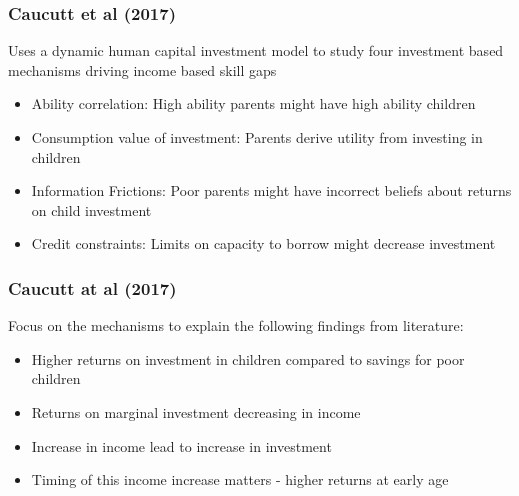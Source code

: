 \documentclass{beamer}
\begin{document}
\begin{frame}
\frametitle{Caucutt et al (2017)}
Uses a dynamic human capital investment model to study four investment based mechanisms driving income based skill gaps
\begin{itemize}
\item Ability correlation: High ability parents might have high ability children 

\item Consumption value of investment: Parents derive utility from investing in children

\item Information Frictions: Poor parents might have incorrect beliefs about returns on child investment
\item Credit constraints: Limits on capacity to borrow might decrease investment

\end{itemize}
\end{frame}


\begin{frame}
\frametitle{Caucutt at al (2017)}
Focus on the mechanisms to explain the following findings from literature:

\begin{itemize}
\item Higher returns on investment in children compared to savings for poor children
\item Returns on marginal investment decreasing in income
\item Increase in income lead to increase in investment
\item Timing of this income increase matters - higher returns at early age

\end{itemize}
\end{frame}


\end{document}

